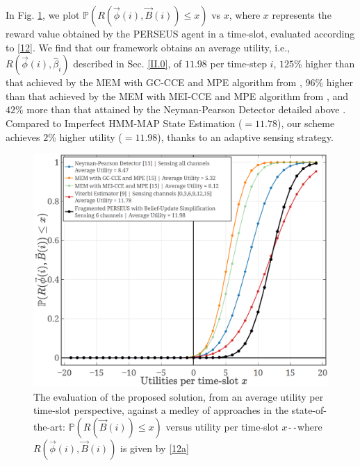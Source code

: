 \documentclass[10pt, twocolumn]{IEEEtran}
\begin{document}
In Fig. \ref{Fig. 5}, we plot $\mathbb{P}(R(\vec{\phi}(i), \vec{B}(i)){\leq}x)$ vs $x$, where $x$ represents the reward value obtained by the PERSEUS agent in a time-slot, evaluated according to \eqref{12}. We find that our framework obtains an average utility, i.e., $R(\vec{\phi}(i),\hat{\beta}_{i})$ described in Sec. \ref{II.0}, of $11.98$ per time-step $i$, $125$\% higher than that achieved by the MEM with GC-CCE and MPE algorithm from \cite{WCL:7}, $96$\% higher than that achieved by the MEM with MEI-CCE and MPE algorithm from \cite{WCL:7}, and $42$\% more than that attained by the Neyman-Pearson Detector detailed above \cite{WCL:11}. Compared to Imperfect HMM-MAP State Estimation (${=}11.78$), our scheme achieves $2$\% higher utility (${=}11.98$), thanks to an adaptive sensing strategy.
\begin{figure} [t]
    \centerline{
    \includegraphics[width=0.8\linewidth]{figures/Minerva_Single_Agent_CDF_plot.png}}
    \vspace{-2mm}
    \caption{The evaluation of the proposed solution, from an average utility per time-slot perspective, against a medley of approaches in the state-of-the-art: $\mathbb{P}(R(\vec{B}(i)){\leq}x)$ versus utility per time-slot $x$\texttt{-{}-}where $R(\vec{\phi}(i),\vec{B}(i))$ is given by \eqref{12a}}
    \vspace{-5mm}
    \label{Fig. 5}
\end{figure}
\end{document}
